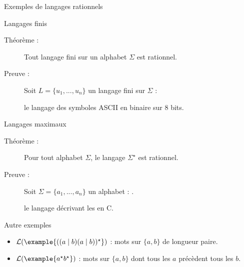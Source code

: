 
\begingroup

\begin{frame}{Exemples de langages rationnels}

  \begin{block}{Langages finis}
    \begin{description}
    \item[Théorème :]
      Tout \alert{langage fini} sur un alphabet $\Sigma$ est rationnel.
    \item[Preuve :]
      Soit $L = \{u_1, ..., u_n\}$ un langage fini sur $\Sigma$ :
    \item[] le langage  des symboles ASCII en binaire sur 8 bits.
    \end{description}
  \end{block}

  \begin{block}{Langages maximaux}
    \begin{description}
    \item[Théorème :]
      Pour tout alphabet $\Sigma$, le langage \alert{$\Sigma^\star$} est rationnel.
    \item[Preuve :]
      Soit $\Sigma = \{a_1, ..., a_n\}$ un alphabet : .
    \item[] le langage décrivant les  en C.
    \end{description}
  \end{block}

  \begin{block}{Autre exemples}
    \begin{itemize}
    \item $\mathcal{L}(\example{((a\mid b)(a\mid b))^\star})$ : mots sur $\{a, b\}$ de longueur paire.
    \item $\mathcal{L}(\example{a^\star b^\star})$ : mots sur $\{a, b\}$ dont tous les $a$ précèdent tous les $b$.
    \end{itemize}
  \end{block}
  
\end{frame}

\endgroup
\endinput
